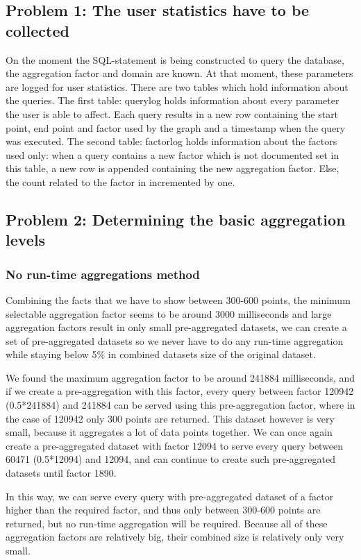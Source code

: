 \subsection{Problem 1: The user statistics have to be collected}
On the moment the SQL-statement is being constructed to query the database, the aggregation factor and domain are known. At that moment, these parameters are logged for user statistics.
There are two tables which hold information about the queries. The first table: querylog holds information about every parameter the user is able to affect. Each query results in a new row containing the start point, end point and factor used by the graph and a timestamp when the query was executed. The second table: factorlog holds information about the factors used only: when a query contains a new factor which is not documented set in this table, a new row is appended containing the new aggregation factor. Else, the count related to the factor in incremented by one.\\

\subsection{Problem 2: Determining the basic aggregation levels}
\subsubsection{No run-time aggregations method}
Combining the facts that we have to show between 300-600 points, the minimum selectable aggregation factor seems to be around 3000 milliseconds and large aggregation factors result in only small pre-aggregated datasets, we can create a set of pre-aggregated datasets so we never have to do any run-time aggregation while staying below 5\% in combined datasets size of the original dataset.

We found the maximum aggregation factor to be around 241884 milliseconds, and if we create a pre-aggregation with this factor, every query between factor 120942 (0.5*241884) and 241884 can be served using this pre-aggregation factor, where in the case of 120942 only 300 points are returned. This dataset however is very small, because it aggregates a lot of data points together. We can once again create a pre-aggregated dataset with factor 12094 to serve every query between 60471 (0.5*12094) and 12094, and can continue to create such pre-aggregated datasets until factor 1890. 

In this way, we can serve every query with pre-aggregated dataset of a factor higher than the required factor, and thus only between 300-600 points are returned, but no run-time aggregation will be required. Because all of these aggregation factors are relatively big, their combined size is relatively only very small.

